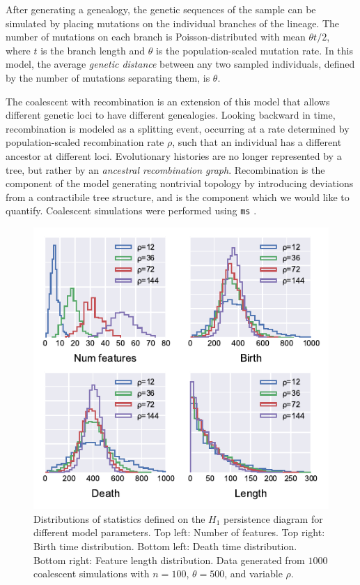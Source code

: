 After generating a genealogy, the genetic sequences of the sample can be simulated by placing mutations on the individual branches of the lineage.
The number of mutations on each branch is Poisson-distributed with mean $\theta t / 2$, where $t$ is the branch length and $\theta$ is the population-scaled mutation rate.
In this model, the average \emph{genetic distance} between any two sampled individuals, defined by the number of mutations separating them, is $\theta$.

The coalescent with recombination is an extension of this model that allows different genetic loci to have different genealogies.
Looking backward in time, recombination is modeled as a splitting event, occurring at a rate determined by population-scaled recombination rate $\rho$, such that an individual has a different ancestor at different loci.
Evolutionary histories are no longer represented by a tree, but rather by an \emph{ancestral recombination graph}.
Recombination is the component of the model generating nontrivial topology by introducing deviations from a contractibile tree structure, and is the component which we would like to quantify.
Coalescent simulations were performed using \texttt{ms} \cite{Hudson:2002}.

\begin{figure}
\begin{center}
\centerline{\includegraphics[width=\columnwidth]{./fig/parametric_inference/coalescent_sims.pdf}}
\caption[Distributions of statistics defined on the $H_1$ persistence diagram for different model parameters]{Distributions of statistics defined on the $H_1$ persistence diagram for different model parameters. Top left: Number of features. Top right: Birth time distribution. Bottom left: Death time distribution. Bottom right: Feature length distribution. Data generated from $1000$ coalescent simulations with $n=100$, $\theta=500$, and variable $\rho$.}
\label{fig:coalescent_sims}
\end{center}
\end{figure}

